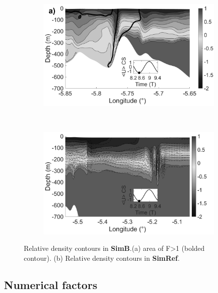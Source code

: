 \documentclass[a4paper,12pt]{article}
\begin{document}
\color{black}
\begin{figure}[!h]
  \centering
  \begin{subfigure}{0.45\linewidth}
  \includegraphics[width=1\textwidth]{RW_j4_9h12_spring.png}
  \end{subfigure}
  ~
    \centering
  \begin{subfigure}{0.45\linewidth}
  \includegraphics[width=1\textwidth]{CV_train_spring.png}
  \end{subfigure}
  \caption{Relative density contours in \textbf{SimB}.(a) area of F>1 (bolded contour). (b) Relative density contours in \textbf{SimRef}.}
  \label{fig_cv_spring}
\end{figure}


\subsection{Numerical factors}
\label{TestNum}
\end{document}
